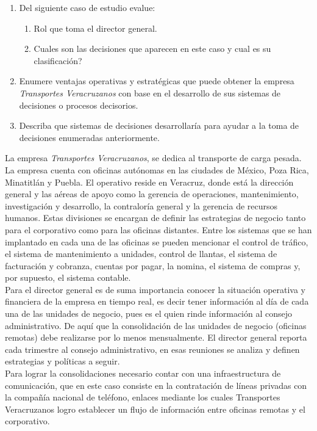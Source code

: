 \documentclass{article}
\begin{document}
\begin{enumerate}
    \item Del siguiente caso de estudio evalue:
    \begin{enumerate}
        \item Rol que toma el director general.
        \item Cuales son las decisiones que aparecen en este caso y cual es su clasificación?
    \end{enumerate}
    \item Enumere ventajas operativas y estratégicas que puede obtener la empresa \emph{Transportes Veracruzanos}
con base en el desarrollo de sus sistemas de decisiones o procesos decisorios.
    \item Describa que sistemas de decisiones desarrollaría para ayudar a la toma de decisiones enumeradas anteriormente.

\end{enumerate}
La empresa \emph{Transportes Veracruzanos}, se dedica al transporte de
carga pesada. La empresa cuenta con oficinas autónomas en las ciudades de México, Poza
Rica, Minatitlán y Puebla. El operativo reside en Veracruz, donde está la dirección general
y las aéreas de apoyo como la gerencia de operaciones, mantenimiento, investigación y
desarrollo, la contraloría general y la gerencia de recursos humanos. Estas divisiones se
encargan de definir las estrategias de negocio tanto para el corporativo como para las
oficinas distantes. Entre los sistemas que se han implantado en cada una de las oficinas se
pueden mencionar el control de tráfico, el sistema de mantenimiento a unidades, control de
llantas, el sistema de facturación y cobranza, cuentas por pagar, la nomina, el sistema de
compras y, por supuesto, el sistema contable.\\

 Para el director general es de suma
importancia conocer la situación operativa y financiera de la empresa en tiempo real, es
decir tener información al día de cada una de las unidades de negocio, pues es el quien
rinde información al consejo administrativo. De aquí que la consolidación de las unidades
de negocio (oficinas remotas) debe realizarse por lo menos mensualmente.
El director general reporta cada trimestre al consejo administrativo, en esas reuniones se
analiza y definen estrategias y políticas a seguir.\\

Para lograr la consolidaciones necesario contar con una infraestructura de comunicación,
que en este caso consiste en la contratación de líneas privadas con la compañía nacional de
teléfono, enlaces mediante los cuales Transportes Veracruzanos logro establecer un flujo de
información entre oficinas remotas y el corporativo.\\
\end{document}
